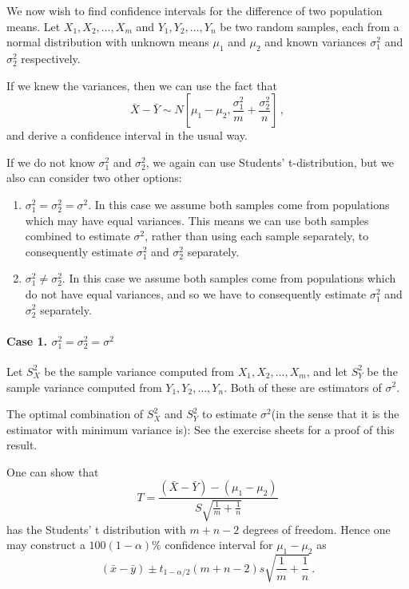 \documentclass[12pt]{article}
\theoremstyle{break}
\begin{document}
We now wish to find confidence intervals for the difference of two population means. Let $X_{1},X_{2},\ldots, X_{m}$ and $Y_{1},Y_{2},\ldots,Y_{n}$ be two random samples, each from a normal distribution with unknown means $\mu_{1}$ and $\mu_{2}$ and known variances $\sigma_{1}^{2}$ and $\sigma_{2}^{2}$ respectively.

If we knew the variances, then we can use the fact that
$$\bar{X}-\bar{Y}\sim N \left[\mu_{1}-\mu_{2},\frac{\sigma_{1}^{2}}{m}+\frac{\sigma_{2}^{2}}{n}\right]\, ,$$
and derive a confidence interval in the usual way.

If we do not know $\sigma_{1}^{2}$ and $\sigma_{2}^{2}$, we again can use Students' t-distribution, but we also can consider two other options:
\begin{enumerate}
\item $\sigma_{1}^{2}=\sigma_{2}^{2}=\sigma^{2}.$ In this case we assume both samples come from populations which may have equal variances. This means we can use both samples combined to estimate $\sigma^2$, rather than using each sample separately, to consequently estimate $\sigma_{1}^{2}$ and $\sigma_{2}^{2}$ separately.
\item $\sigma_{1}^{2} \neq \sigma_{2}^{2}.$ In this case we assume both samples come from populations which do not have equal variances, and so we have to consequently estimate $\sigma_{1}^{2}$ and $\sigma_{2}^{2}$ separately.
\end{enumerate}
\paragraph{Case 1. $\sigma_{1}^{2}=\sigma_{2}^{2}=\sigma^{2}$}
Let $S_{X}^{2}$ be the sample variance computed from $X_{1},X_{2},\ldots, X_{m}$, and let $S_{Y}^{2}$ be the sample variance computed from $Y_{1},Y_{2},\ldots,Y_{n}$. Both of these are estimators of $\sigma^{2}$.
\begin{mdframed}
The optimal combination of $S_{X}^{2}$ and $S_{Y}^{2}$ to estimate $\sigma^2$(in the sense that it is the estimator with minimum variance is):
\textcolor[rgb]{1.00,1.00,1.00}{\lipsum[1-2]}
See the exercise sheets for a proof of this result.
\end{mdframed}

One can show that
$$
T=\frac{(\bar{X}-\bar{Y})-(\mu_{1}-\mu_{2})}{S\sqrt{\frac{1}{m}+\frac{1}{n}}}
$$
has the Students' t distribution with $m+n-2$ degrees of freedom. Hence one may construct a $100(1-\alpha)\%$ confidence interval for $\mu_{1}-\mu_{2}$ as
$$
(\bar{x}-\bar{y}) \pm t_{1-\alpha/2}(m+n-2)s\sqrt{\frac{1}{m}+\frac{1}{n}}\, .
$$
\end{document}
